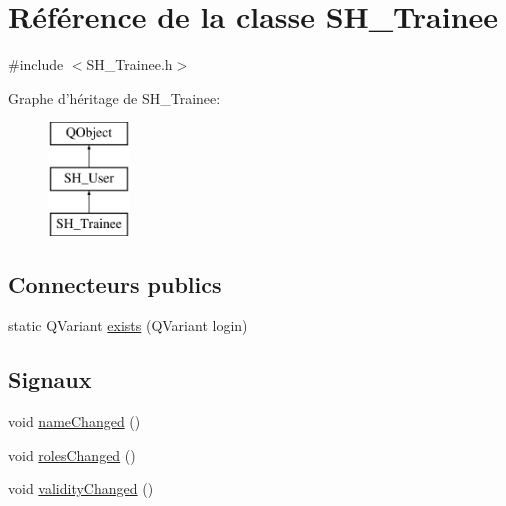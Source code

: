 \hypertarget{classSH__Trainee}{\section{Référence de la classe S\-H\-\_\-\-Trainee}
\label{classSH__Trainee}
}


{\ttfamily \#include $<$S\-H\-\_\-\-Trainee.\-h$>$}

Graphe d'héritage de S\-H\-\_\-\-Trainee\-:\begin{figure}[H]
\begin{center}
\leavevmode
\includegraphics[height=3.000000cm]{classSH__Trainee}
\end{center}
\end{figure}
\subsection*{Connecteurs publics}
\begin{DoxyCompactItemize}
\item 
static Q\-Variant \hyperlink{classSH__User_aeefcf386df717163d07e17c48205814b}{exists} (Q\-Variant login)
\end{DoxyCompactItemize}
\subsection*{Signaux}
\begin{DoxyCompactItemize}
\item 
void \hyperlink{classSH__User_a02445292383053e7413df52ad89dad21}{name\-Changed} ()
\item 
void \hyperlink{classSH__User_aa6c441f9147186a7af987cd600c3ac33}{roles\-Changed} ()
\item 
void \hyperlink{classSH__User_a2b36efbf2a2127f7c6ab98c112d49dc0}{validity\-Changed} ()
\end{DoxyCompactItemize}

